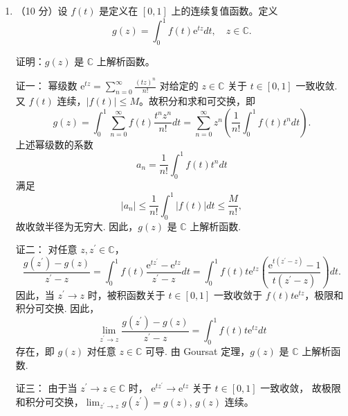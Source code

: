 \begin{enumerate}
（2）Riemann 映射定理.

答：设 $\Omega \subset \mathbb{C}$ 是单连通区域，且 $\Omega \neq \mathbb{C}$，
则对任意 $a \in \Omega$，存在唯一的共形映射 $f: \Omega \rightarrow \mathbb{D}$ 
使得 $f(a)=0, f^{\prime}(a)>0$．

（3）次调和函数.

答：设 $u(z)$ 是区域 $\Omega$ 上实值连续函数，
对任意 $z_{0} \in \Omega$，存在 $\rho>0$，使得圆盘 $D(z_{0}, \rho) \subset \Omega$，
且对任意 $0<r<\rho$，满足如下次均值不等式
$$u(z_{0}) \leq \frac{1}{2 \pi} \int_{0}^{2 \pi} u(z_{0}+r \mathrm{e}^{\mathrm{i} \theta}) d \theta,$$
则称 $u(z)$ 是 $\Omega$ 上次调和函数.

或

设 $u(z)$ 是区域 $\Omega$ 上实值连续函数，对任意圆盘 $D(z_{0}, r) \subset \Omega$ 以及 $D(z_{0}, r)$ 上的调和函数 $v(z)$，
函数 $u(z)-v(z)$ 在 $D(z_{0}, r)$ 满足最大值原理，则称 $u(z)$为 $\Omega$ 上次调和函数。

\item[三]（10 分）设 $f(t)$ 是定义在 $[0,1]$ 上的连续复值函数。定义
$$g(z)=\int_{0}^{1} f(t) \mathrm{e}^{tz} dt, \quad z \in \mathbb{C}.$$

证明：$g(z)$ 是 $\mathbb{C}$ 上解析函数。

证一：
幂级数 $\displaystyle \mathrm{e}^{tz}=\sum_{n=0}^{\infty} \frac{(tz)^{n}}{n!}$ 对给定的 $z \in \mathbb{C}$ 关于 $t \in[0,1]$ 一致收敛. 
又 $f(t)$ 连续，$|f(t)| \leq M$。故积分和求和可交换，即
$$g(z)=\int_{0}^{1} \sum_{n=0}^{\infty} f(t) \frac{t^{n} z^{n}}{n!} dt
=\sum_{n=0}^{\infty} z^{n}\left(\frac{1}{n!} \int_{0}^{1} f(t) t^{n} dt\right).$$
上述幂级数的系数
$$a_{n}=\frac{1}{n!} \int_{0}^{1} f(t) t^{n} dt$$
满足
$$|a_{n}| \leq \frac{1}{n!} \int_{0}^{1}|f(t)| dt \leq \frac{M}{n!},$$
故收敛半径为无穷大. 因此，$g(z)$ 是 $\mathbb{C}$ 上解析函数.

证二：
对任意 $z, z^{\prime} \in \mathbb{C}$，
$$\frac{g(z^{\prime})-g(z)}{z^{\prime}-z}
=\int_{0}^{1} f(t) \frac{\mathrm{e}^{tz^{\prime}}-\mathrm{e}^{tz}}{z^{\prime}-z} dt
=\int_{0}^{1} f(t) t \mathrm{e}^{tz}\left(\frac{\mathrm{e}^{t(z^{\prime}-z)}-1}{t(z^{\prime}-z)}\right) dt.$$
因此，当 $z^{\prime} \rightarrow z$ 时，被积函数关于 $t \in[0,1]$ 一致收敛于 $f(t) t \mathrm{e}^{tz}$，极限和积分可交换. 因此，
$$\lim_{z^{\prime} \rightarrow z} \frac{g(z^{\prime})-g(z)}{z^{\prime}-z}
=\int_{0}^{1} f(t) t \mathrm{e}^{t z} dt$$
存在，即 $g(z)$ 对任意 $z \in \mathbb{C}$ 可导.
由 Goursat 定理，$g(z)$ 是 $\mathbb{C}$ 上解析函数.

证三：
由于当 $z^{\prime} \rightarrow z \in \mathbb{C}$ 时， 
$\mathrm{e}^{tz^{\prime}} \rightarrow \mathrm{e}^{tz}$ 关于 $t \in[0,1]$ 一致收敛，
故极限和积分可交换，$\lim_{z^{\prime} \rightarrow z} g(z^{\prime})=g(z)$, $g(z)$ 连续。


\end{enumerate}
